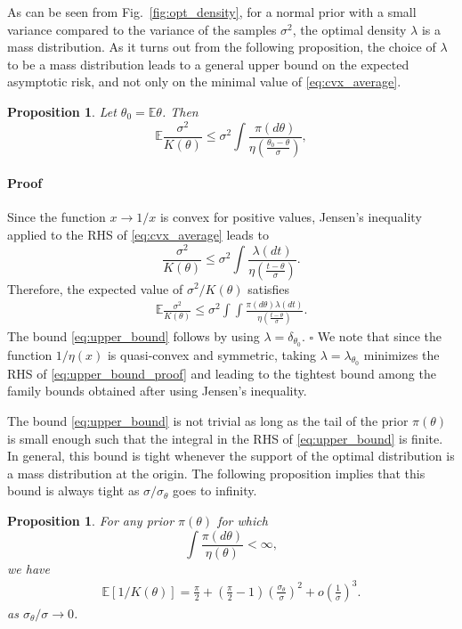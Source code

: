 \documentclass[letterpaper, conference]{IEEEtran}      %
\newtheorem{prop}[thm]{\bf {Proposition}}
\newenvironment{proof}{\paragraph*{Proof}}{\hfill$\square$ \newline}
\begin{document}
As can be seen from Fig.~\ref{fig:opt_density}, for a normal prior with a small variance compared to the variance of the samples $\sigma^2$, the optimal density $\lambda$ is a mass distribution. As it turns out from the following proposition, the choice of  $\lambda$ to be a mass distribution leads to a general upper bound on the expected asymptotic risk, and not only on the minimal value of \eqref{eq:cvx_average}. 
\begin{prop}\label{prop:upper_bound}
Let $\theta_0 = \mathbb E \theta$. Then
\begin{equation}
\label{eq:upper_bound}
\mathbb E \frac{\sigma^2}{K(\theta)}  \leq \sigma^2 \int \frac{\pi(d\theta)}{\eta \left( \frac{\theta_0 - \theta}{\sigma} \right)}, 
\end{equation}
\end{prop}
\begin{proof}
Since the function $x \rightarrow 1/x$ is convex for positive values, Jensen's inequality applied to the RHS of \eqref{eq:cvx_average} leads to
\[
 \frac{\sigma^2}{K(\theta)} \leq \sigma^2 \int  \frac{ \lambda(dt)}{ \eta \left( \frac{t-\theta}{\sigma} \right)  }. 
\]
Therefore, the expected value of $\sigma^2/K(\theta)$ satisfies
\begin{align}
\mathbb E  \frac{\sigma^2}{K(\theta)}  \leq \sigma^2  \int \int \frac{\pi(d\theta) \lambda(dt) }{\eta \left( \frac{t - \theta}{\sigma} \right)}. \label{eq:upper_bound_proof}
\end{align}
The bound \eqref{eq:upper_bound} follows by using $\lambda = \delta_{\theta_0}$. 
\end{proof}
We note that since the function $1/\eta(x)$ is quasi-convex and symmetric, taking $\lambda = \lambda_{\theta_0}$ minimizes the RHS of \eqref{eq:upper_bound_proof} and leading to the tightest bound among the family bounds obtained after using Jensen's inequality.  \par
The bound \eqref{eq:upper_bound} is not trivial as long as the tail of the prior $\pi(\theta)$ is small enough such that the integral in the RHS of \eqref{eq:upper_bound} is finite. In general, this bound is tight whenever the support of the optimal distribution is a mass distribution at the origin. The following proposition implies that this bound is always tight as $\sigma / \sigma_\theta$ goes to infinity.
\begin{prop} \label{prop:asymp}
 For any prior $\pi(\theta)$ for which
\[
\int \frac{\pi(d\theta)}{\eta \left(\theta \right)} < \infty,
\]
we have 
\begin{align}
\label{eq:asymp}
\mathbb E [1/K(\theta)] = \frac{\pi}{2} + \left( \frac{\pi}{2} - 1\right) \left(\frac{\sigma_\theta}{\sigma} \right)^2 + o \left(\frac{1}{\sigma} \right)^3. 
\end{align}
as $\sigma_\theta / \sigma \rightarrow 0$. 
\end{prop}
\end{document}
